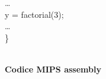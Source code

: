 \documentclass[../main.tex]{subfiles}
\begin{document}
\begin{table}[h!]
\begin{minipage}{.5\linewidth}
{            \hspace*{0cm} \hspace*{0cm} \hspace*{0cm} \hspace*{0cm} \dots \\
            \hspace*{0cm} \hspace*{0cm} \hspace*{0cm} \hspace*{0cm} y = factorial(3); \\
            \hspace*{0cm} \hspace*{0cm} \hspace*{0cm} \hspace*{0cm} \dots \\
            \} \\
        }
    \end{minipage}
\end{table}
\\[5mm]
\textbf{Codice MIPS assembly} \\[2mm]
\end{document}
